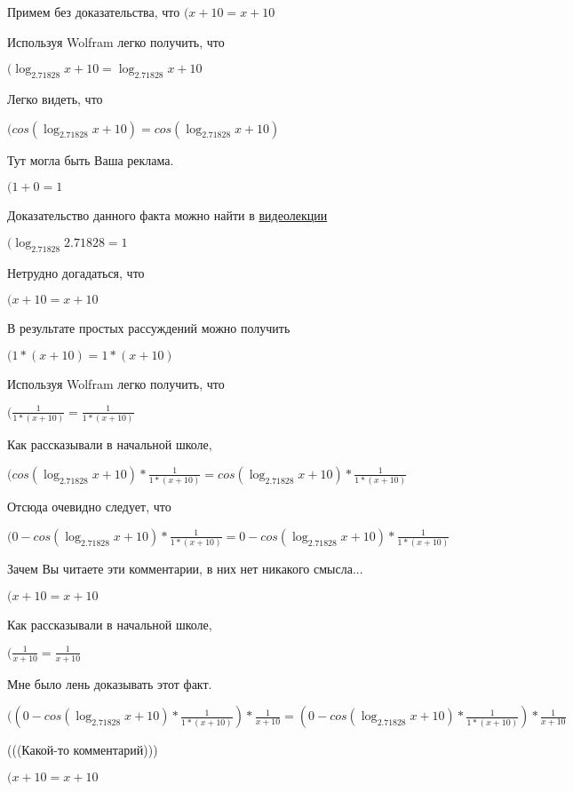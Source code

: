 \documentclass[12pt,a4paper,fleqn]{article}
\theoremstyle{definition}
\begin{document}
Примем без доказательства, что
$( x  +  10  =  x  +  10 $

Используя Wolfram легко получить, что

$(\log_{ 2.71828 }{ x  +  10 } = \log_{ 2.71828 }{ x  +  10 }$

Легко видеть, что

$(cos(\log_{ 2.71828 }{ x  +  10 }) = cos(\log_{ 2.71828 }{ x  +  10 })$

Тут могла быть Ваша реклама.

$( 1  +  0  =  1 $

Доказательство данного факта можно найти в \href{https://www.youtube.com/watch?v=dQw4w9WgXcQ}{видеолекции}

$(\log_{ 2.71828 }{ 2.71828 } =  1 $

Нетрудно догадаться, что

$( x  +  10  =  x  +  10 $

В результате простых рассуждений можно получить

$( 1  * ( x  +  10 ) =  1  * ( x  +  10 )$

Используя Wolfram легко получить, что

$(\frac{ 1 }{ 1  * ( x  +  10 )}
 = \frac{ 1 }{ 1  * ( x  +  10 )}
$

Как рассказывали в начальной школе,

$(cos(\log_{ 2.71828 }{ x  +  10 }) * \frac{ 1 }{ 1  * ( x  +  10 )}
 = cos(\log_{ 2.71828 }{ x  +  10 }) * \frac{ 1 }{ 1  * ( x  +  10 )}
$

Отсюда очевидно следует, что

$( 0  - cos(\log_{ 2.71828 }{ x  +  10 }) * \frac{ 1 }{ 1  * ( x  +  10 )}
 =  0  - cos(\log_{ 2.71828 }{ x  +  10 }) * \frac{ 1 }{ 1  * ( x  +  10 )}
$

Зачем Вы читаете эти комментарии, в них нет никакого смысла...

$( x  +  10  =  x  +  10 $

Как рассказывали в начальной школе,

$(\frac{ 1 }{ x  +  10 }
 = \frac{ 1 }{ x  +  10 }
$

Мне было лень доказывать этот факт.

$(( 0  - cos(\log_{ 2.71828 }{ x  +  10 }) * \frac{ 1 }{ 1  * ( x  +  10 )}
) * \frac{ 1 }{ x  +  10 }
 = ( 0  - cos(\log_{ 2.71828 }{ x  +  10 }) * \frac{ 1 }{ 1  * ( x  +  10 )}
) * \frac{ 1 }{ x  +  10 }
$

(((Какой-то комментарий)))

$( x  +  10  =  x  +  10 $
\end{document}
